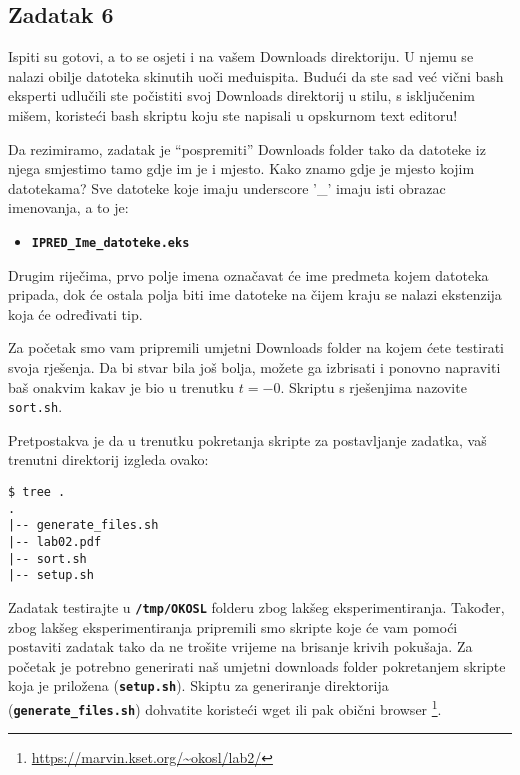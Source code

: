 \documentclass[12pt,a4paper]{article}
\newcommand{\shell}[1]{\texttt{\textbf{#1}}}
\begin{document}
    \subsection*{Zadatak 6}
    Ispiti su gotovi, a to se osjeti i na vašem Downloads direktoriju. U njemu
    se nalazi obilje datoteka skinutih uoči međuispita. Budući da ste sad već
    vični bash eksperti udlučili ste počistiti svoj Downloads direktorij u
    stilu, s isključenim mišem, koristeći bash skriptu koju ste napisali u
    opskurnom text editoru!

    Da rezimiramo, zadatak je ``pospremiti'' Downloads folder tako da datoteke iz
    njega smjestimo tamo gdje im je i mjesto. Kako znamo gdje je mjesto kojim
    datotekama? Sve datoteke koje imaju underscore '\_' imaju isti obrazac
    imenovanja, a to je:

    \begin{itemize}
        \item[] \shell{IPRED\_Ime\_datoteke.eks}
    \end{itemize}

    Drugim riječima, prvo polje imena označavat će ime predmeta kojem datoteka
    pripada, dok će ostala polja biti ime datoteke na čijem kraju se nalazi
    ekstenzija koja će određivati tip.

    Za početak smo vam pripremili umjetni Downloads folder na kojem ćete
    testirati svoja rješenja. Da bi stvar bila još bolja, možete ga izbrisati
    i ponovno napraviti baš onakvim kakav je bio u trenutku $t = -0$. Skriptu
    s rješenjima nazovite \texttt{sort.sh}.

    Pretpostakva je da u trenutku pokretanja skripte za postavljanje zadatka,
    vaš trenutni direktorij izgleda ovako:

    \begin{verbatim}
$ tree .
.
|-- generate_files.sh
|-- lab02.pdf
|-- sort.sh
|-- setup.sh
    \end{verbatim}

    Zadatak testirajte u \shell{/tmp/OKOSL} folderu zbog lakšeg eksperimentiranja.
    Također, zbog lakšeg eksperimentiranja pripremili smo skripte koje će vam pomoći
    postaviti zadatak tako da ne trošite vrijeme na brisanje krivih pokušaja.
    Za početak je potrebno generirati naš umjetni downloads folder pokretanjem
    skripte koja je priložena (\shell{setup.sh}). Skiptu za generiranje direktorija
    (\shell{generate\_files.sh}) dohvatite koristeći wget ili pak obični browser
    \footnote{\url{https://marvin.kset.org/~okosl/lab2/}}.
\end{document}

